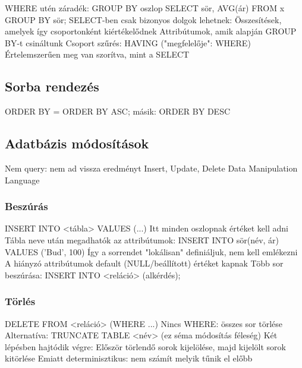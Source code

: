 \documentclass[12pt,a4paper]{article}
\begin{document}
\begin{outline}
	\1 WHERE utén záradék: GROUP BY oszlop
	\1 SELECT sör, AVG(ár) FROM x GROUP BY sör;
	\1 SELECT-ben csak bizonyos dolgok lehetnek:
		\2 Összesítések, amelyek így csoportonként kiértékelődnek
		\2 Attribútumok, amik alapján GROUP BY-t csináltunk
	\1 Csoport szűrés: HAVING ("megfelelője": WHERE)
		\2 Értelemszerűen meg van szorítva, mint a SELECT 
\end{outline}

\subsection{Sorba rendezés}

\begin{outline}
	\1 ORDER BY = ORDER BY ASC; másik: ORDER BY DESC
\end{outline}

\pagebreak

\subsection{Adatbázis módosítások}

\begin{outline}
	\1 Nem query: nem ad vissza eredményt
	\1 Insert, Update, Delete
	\1 Data Manipulation Language
\end{outline}

\subsubsection{Beszúrás}

\begin{outline}
	\1 INSERT INTO <tábla> VALUES (...)
		\2 Itt minden oszlopnak értéket kell adni
	\1 Tábla neve után megadhatók az attribútumok:
		\2 INSERT INTO sör(név, ár) VALUES ('Bud', 100)
		\2 Így a sorrendet "lokálisan" definiáljuk, nem kell emlékezni
		\2 A hiányzó attribútumok default (NULL/beállított) értéket kapnak
	\1 Több sor beszúrása: INSERT INTO <reláció> (alkérdés);
\end{outline}

\subsubsection{Törlés}

\begin{outline}
	\1 DELETE FROM <reláció> (WHERE ...)
	\1 Nincs WHERE: összes sor törlése
		\2 Alternatíva: TRUNCATE TABLE <név> (ez séma módosítás féleség)
	\1 Két lépésben hajtódik végre:
		\2 Először törlendő sorok kijelölése, majd kijelölt sorok kitörlése
		\2 Emiatt determinisztikus: nem számít melyik tűnik el előbb
\end{outline}
\end{document}
